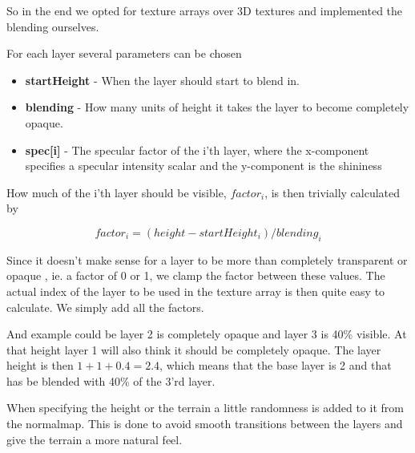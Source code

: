 So in the end we opted for texture arrays over 3D textures and
implemented the blending ourselves.

For each layer several parameters can be chosen

\newcommand{\layerProp}[2]{\item \textbf{#1} - #2}
\begin{itemize}
  \layerProp{startHeight}{When the layer should start to blend in.}
  \layerProp{blending}{How many units of height it takes the layer to
    become completely opaque.}
  \layerProp{spec[i]}{The specular factor of the i'th layer, where the
    x-component specifies a specular intensity scalar and the
    y-component is the shininess}
\end{itemize}

How much of the i'th layer should be visible, $factor_i$, is then
trivially calculated by

\begin{displaymath}
  factor_i = (height - startHeight_i) / blending_i
\end{displaymath}

Since it doesn't make sense for a layer to be more than completely
transparent or opaque , ie. a factor of 0 or 1, we clamp the factor
between these values. The actual index of the layer to be used in the
texture array is then quite easy to calculate. We simply add all the
factors. 

And example could be layer 2 is completely opaque and layer 3 is 40\%
visible. At that height layer 1 will also think it should be
completely opaque. The layer height is then $1 + 1 + 0.4 = 2.4$, which
means that the base layer is 2 and that has be blended with 40\% of
the 3'rd layer.


When specifying the height or the terrain a little randomness is added
to it from the normalmap. This is done to avoid smooth transitions
between the layers and give the terrain a more natural feel.


